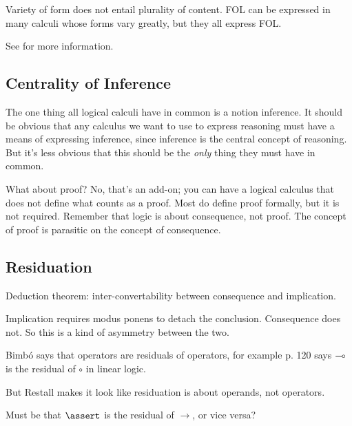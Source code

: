 \documentclass{article}
\begin{document}
Variety of form does not entail plurality of content. FOL can be
expressed in many calculi whose forms vary greatly, but they all
express FOL.

See  \parencite{sep-logical-pluralism}
for more information.


\subsection{Centrality of Inference}

The one thing all logical calculi have in common is a notion
inference. It should be obvious that any calculus we want to use to
express reasoning must have a means of expressing inference, since
inference is the central concept of reasoning. But it's less obvious
that this should be the \textit{only} thing they must have in common.

What about proof? No, that's an add-on; you can have a logical
calculus that does not define what counts as a proof. Most do define
proof formally, but it is not required. Remember that logic is about
consequence, not proof. The concept of proof is parasitic on the
concept of consequence.


\subsection{Residuation}

Deduction theorem: inter-convertability between consequence and
implication.

Implication requires modus ponens to detach the conclusion.
Consequence does not. So this is a kind of asymmetry between the two.


Bimbó says that operators are residuals of operators, for example
p. 120 says \(\multimap\) is the residual of \(\circ\) in linear
logic.

But Restall makes it look like residuation is about operands, not
operators.

Must be that \(\linfer\) is the residual of \(→\), or vice versa?


\end{document}
